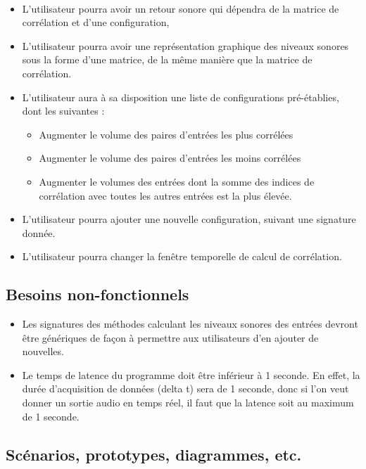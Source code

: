 \documentclass{article}
\begin{document}
    \paragraph{}
    \begin{itemize}
      \item L'utilisateur pourra avoir un retour sonore qui dépendra de la
      matrice de corrélation et d'une configuration,
      \item L'utilisateur pourra avoir une représentation graphique des niveaux
      sonores sous la forme d'une matrice, de la même manière que la matrice de
      corrélation.
      \item L'utilisateur aura à sa disposition une liste de configurations
      pré-établies, dont les suivantes :
      \begin{itemize}
        \item Augmenter le volume des paires d'entrées les plus corrélées
        \item Augmenter le volume des paires d'entrées les moins corrélées
        \item Augmenter le volumes des entrées dont la somme des indices de
        corrélation avec toutes les autres entrées est la plus élevée.
      \end{itemize}
      \item L'utilisateur pourra ajouter une nouvelle configuration, suivant
      une signature donnée.
      \item L'utilisateur pourra changer la fenêtre temporelle de calcul de
      corrélation.
    \end{itemize}
    \subsection{Besoins non-fonctionnels}
    \begin{itemize}
      \item Les signatures des méthodes calculant les niveaux sonores des
      entrées devront être génériques de façon à permettre aux utilisateurs d'en
      ajouter de nouvelles.
      \item Le temps de latence du programme doit être inférieur à 1 seconde.
      En effet, la durée d'acquisition de données (delta t) sera de 1 seconde,
      donc si l'on veut donner un sortie audio en temps réel, il faut que la latence
      soit au maximum de 1 seconde.
    \end{itemize}
    \subsection{Scénarios, prototypes, diagrammes, etc.}
\end{document}
